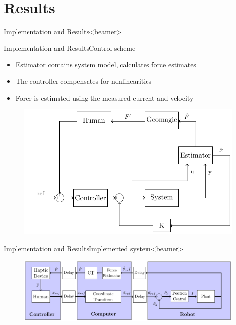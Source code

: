 \section{Results}

\begin{frame}{Implementation and Results}{}<beamer>

\end{frame}

\begin{frame}{Implementation and Results}{Control scheme}
  \begin{itemize}
    \item Estimator contains system model, calculates force estimates
    \item The controller compensates for nonlinearities
    \item Force is estimated using the measured current and velocity
    \end{itemize}
	\begin{figure}
	\centering
	\includegraphics[scale=0.7]{Billeder/kalman_control}
	\end{figure}
\end{frame}

\begin{frame}{Implementation and Results}{Implemented system}<beamer>

\begin{figure}
	\centering
	\includegraphics[scale=0.7]{Billeder/simple_control}
\end{figure}
\end{frame}

